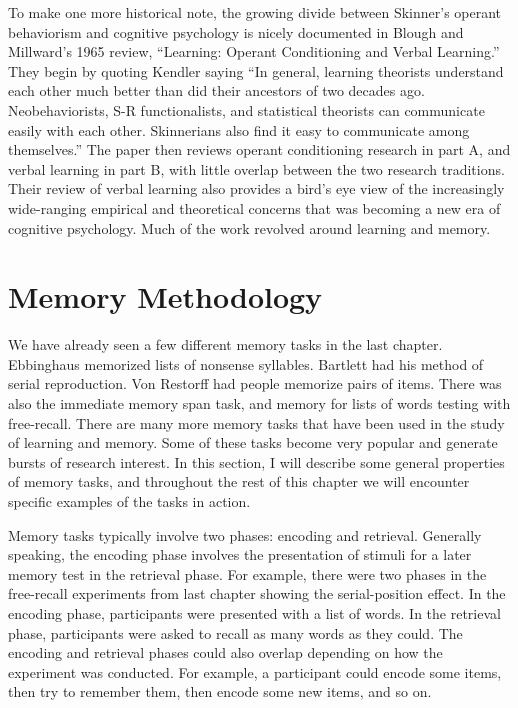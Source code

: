 \documentclass[
  oneside,
  12pt]{crumpbook}
\begin{document}
To make one more historical note, the growing divide between Skinner's operant behaviorism and cognitive psychology is nicely documented in Blough and Millward's 1965 review, ``Learning: Operant Conditioning and Verbal Learning.'' They begin by quoting Kendler saying ``In general, learning theorists understand each other much better than did their ancestors of two decades ago. Neobehaviorists, S-R functionalists, and statistical theorists can communicate easily with each other. Skinnerians also find it easy to communicate among themselves.'' The paper then reviews operant conditioning research in part A, and verbal learning in part B, with little overlap between the two research traditions. Their review of verbal learning also provides a bird's eye view of the increasingly wide-ranging empirical and theoretical concerns that was becoming a new era of cognitive psychology. Much of the work revolved around learning and memory.

\hypertarget{memory-methodology}{%
\section{Memory Methodology}\label{memory-methodology}}

We have already seen a few different memory tasks in the last chapter. Ebbinghaus memorized lists of nonsense syllables. Bartlett had his method of serial reproduction. Von Restorff had people memorize pairs of items. There was also the immediate memory span task, and memory for lists of words testing with free-recall. There are many more memory tasks that have been used in the study of learning and memory. Some of these tasks become very popular and generate bursts of research interest. In this section, I will describe some general properties of memory tasks, and throughout the rest of this chapter we will encounter specific examples of the tasks in action.

Memory tasks typically involve two phases: encoding and retrieval. Generally speaking, the encoding phase involves the presentation of stimuli for a later memory test in the retrieval phase. For example, there were two phases in the free-recall experiments from last chapter showing the serial-position effect. In the encoding phase, participants were presented with a list of words. In the retrieval phase, participants were asked to recall as many words as they could. The encoding and retrieval phases could also overlap depending on how the experiment was conducted. For example, a participant could encode some items, then try to remember them, then encode some new items, and so on.
\end{document}
